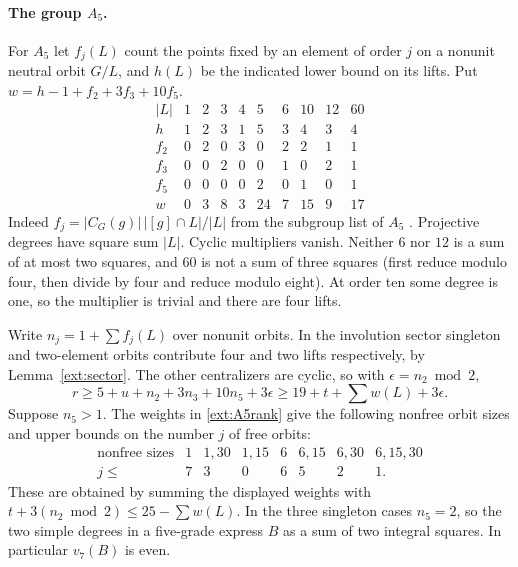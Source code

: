 \documentclass[11pt]{amsart}
\numberwithin{equation}{section}
\theoremstyle{definition}
\theoremstyle{plain}
\begin{document}
\paragraph{The group $A_5$.}
For $A_5$ let $f_j(L)$ count the points fixed by an element of order $j$
on a nonunit neutral orbit $G/L$, and $h(L)$ be the indicated lower
bound on its lifts. Put $w=h-1+f_2+3f_3+10f_5$.
\[
\begin{array}{c|rrrrrrrrr}
 |L|&1&2&3&4&5&6&10&12&60\\\hline
 h&1&2&3&1&5&3&4&3&4\\
 f_2&0&2&0&3&0&2&2&1&1\\
 f_3&0&0&2&0&0&1&0&2&1\\
 f_5&0&0&0&0&2&0&1&0&1\\
 w&0&3&8&3&24&7&15&9&17
\end{array}
\]
Indeed $f_j=|C_G(g)|\,|[g]\cap L|/|L|$ from the subgroup list of
$A_5$ \cite{AtlasGroups}. Projective degrees have square sum $|L|$.
Cyclic multipliers vanish. Neither $6$ nor $12$ is a sum of at most
two squares, and $60$ is not a sum of three squares (first reduce
modulo four, then divide by four and reduce modulo eight). At order
ten some degree is one, so the multiplier is trivial and there are
four lifts.

Write $n_j=1+\sum f_j(L)$ over nonunit orbits. In the involution
sector singleton and two-element orbits contribute four and two lifts
respectively, by Lemma~\ref{ext:sector}. The other centralizers are
cyclic, so with $\epsilon=n_2\bmod2$,
\begin{equation}\label{ext:A5rank}
 r\ge5+u+n_2+3n_3+10n_5+3\epsilon
 \ge19+t+\sum w(L)+3\epsilon .
\end{equation}
Suppose $n_5>1$. The weights in \eqref{ext:A5rank} give the following
nonfree orbit sizes and upper bounds on the number $j$ of free orbits:
\[
\begin{array}{c|rrrrrrr}
\text{nonfree sizes}&1&1,30&1,15&6&6,15&6,30&6,15,30\\\hline
j\le&7&3&0&6&5&2&1 .
\end{array}
\]
These are obtained by summing the displayed weights with
$t+3(n_2\bmod2)\le25-\sum w(L)$. In the three singleton cases $n_5=2$,
so the two simple degrees in a five-grade express $B$ as a sum of
two integral squares. In particular $v_7(B)$ is even.
\end{document}
